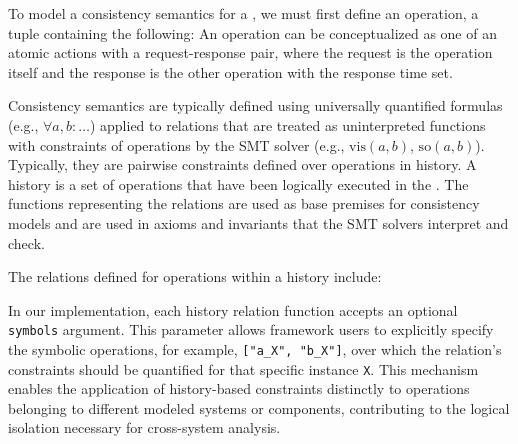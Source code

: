 To model a consistency semantics for a \sysmod{}, we must first define an
operation, a tuple containing the following:
An operation
can be conceptualized as one of an atomic actions with a
request-response pair, where the request
is the operation itself and the response is the other operation with the
response time set.

Consistency semantics are typically defined using universally
quantified formulas
(e.g., $\forall a, b: \dots$) applied to relations that are treated
as uninterpreted
functions with constraints of operations by the SMT solver
(e.g., $\text{vis}(a, b)$, $\text{so}(a, b)$).
Typically, they are pairwise constraints defined over operations in history.
A history is a set of operations that have been logically executed in the
\sysmod{}.
The functions representing the relations are used as base premises
for consistency
models and are used in axioms and invariants that the SMT solvers
interpret and check.

The relations defined for operations within a history include:

In our implementation, each history relation function accepts an optional
\texttt{symbols} argument. This parameter allows framework users to
explicitly specify the symbolic operations, for example, \texttt{["a\_X",
"b\_X"]}, over which the relation's constraints should be quantified
for that specific instance \texttt{X}. This mechanism enables the application of
history-based constraints distinctly to operations belonging to
different modeled systems or components, contributing to the logical
isolation necessary for cross-system analysis.

